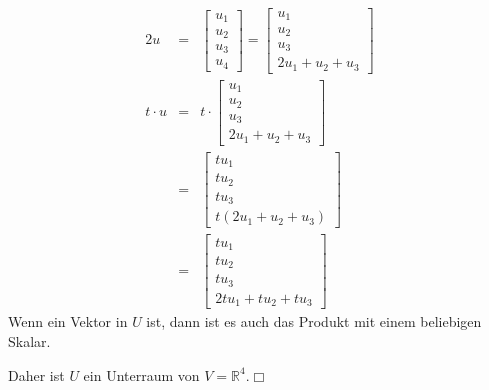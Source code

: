 \documentclass[10pt,a4paper,oneside,ngerman,numbers=noenddot]{scrartcl}
\begin{document}
\begin{alignat*}{2}
u &=& \begin{bmatrix}
u_{1} \\
u_{2} \\
u_{3} \\
u_{4}
\end{bmatrix} =
\begin{bmatrix}
u_{1} \\
u_{2} \\
u_{3} \\
2u_{1} + u_{2} + u_{3}
\end{bmatrix} \\
t \cdot u &=& t \cdot \begin{bmatrix}
u_{1} \\
u_{2} \\
u_{3} \\
2u_{1} + u_{2} + u_{3}
\end{bmatrix} \\
&=& \begin{bmatrix}
tu_{1} \\
tu_{2} \\
tu_{3} \\
t(2u_{1} + u_{2} + u_{3})
\end{bmatrix} \\
&=& \begin{bmatrix}
tu_{1} \\
tu_{2} \\
tu_{3} \\
2tu_{1} + tu_{2} + tu_{3}
\end{bmatrix}
\end{alignat*}
Wenn ein Vektor in $U$ ist, dann ist es auch das Produkt mit einem beliebigen Skalar.

Daher ist $U$ ein Unterraum von $V = \mathbb{R}^{4}$.\hfill $\Box$
\end{document}

